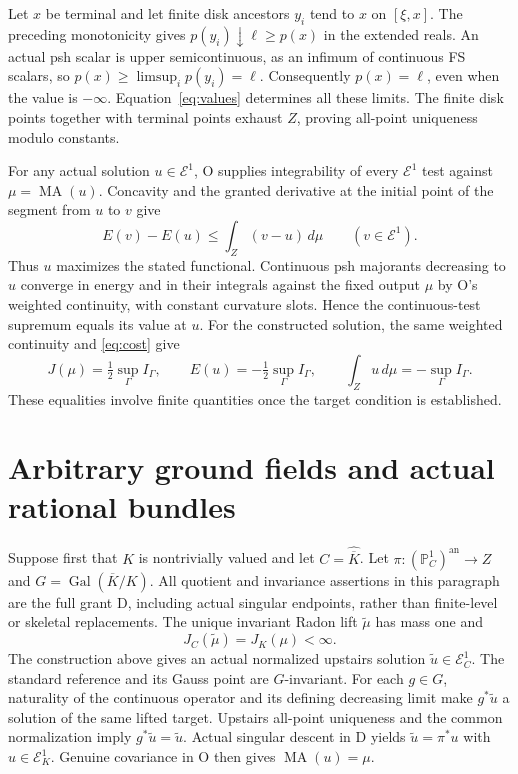 \documentclass[11pt]{article}
\newcommand{\MA}{\operatorname{MA}}
\newcommand{\E}{\mathcal E}
\newcommand{\an}{\mathrm{an}}
\begin{document}
Let $x$ be terminal and let finite disk ancestors $y_i$ tend
to $x$ on $[\xi,x]$. The preceding monotonicity gives
$p(y_i)\downarrow\ell\geq p(x)$ in the extended reals.
An actual psh scalar is upper semicontinuous, as an infimum
of continuous FS scalars, so
$p(x)\geq\limsup_i p(y_i)=\ell$. Consequently
$p(x)=\ell$, even when the value is $-\infty$.
Equation~\eqref{eq:values} determines all these limits.
The finite disk points together with terminal points exhaust
$Z$, proving all-point uniqueness modulo constants.

For any actual solution $u\in\E^1$, O supplies integrability
of every $\E^1$ test against $\mu=\MA(u)$. Concavity and
the granted derivative at the initial point of the segment
from $u$ to $v$ give
\[
 E(v)-E(u)\leq\int_Z(v-u)\,d\mu\qquad(v\in\E^1).
\]
Thus $u$ maximizes the stated functional. Continuous psh
majorants decreasing to $u$ converge in energy and in their
integrals against the fixed output $\mu$ by O's weighted
continuity, with constant curvature slots. Hence the
continuous-test supremum equals its value at $u$.
For the constructed solution, the same weighted continuity
and \eqref{eq:cost} give
\[
 J(\mu)=\tfrac12\sup_\Gamma I_\Gamma,
 \qquad E(u)=-\tfrac12\sup_\Gamma I_\Gamma,
 \qquad \int_Zu\,d\mu=-\sup_\Gamma I_\Gamma.
\]
These equalities involve finite quantities once the target
condition is established.

\section{Arbitrary ground fields and actual rational bundles}
\label{sec:descent}

Suppose first that $K$ is nontrivially valued and let
$C=\widehat{\overline K}$. Let
$\pi:(\mathbb P^1_C)^\an\to Z$ and
$G=\operatorname{Gal}(\overline K/K)$. All quotient and
invariance assertions in this paragraph are the full grant D,
including actual singular endpoints, rather than finite-level
or skeletal replacements. The unique invariant Radon lift
$\widetilde\mu$ has mass one and
\[
                  J_C(\widetilde\mu)=J_K(\mu)<\infty.
\]
The construction above gives an actual normalized upstairs
solution $\widetilde u\in\E_C^1$. The standard reference
and its Gauss point are $G$-invariant. For each $g\in G$,
naturality of the continuous operator and its defining
decreasing limit make $g^*\widetilde u$ a solution of the
same lifted target. Upstairs all-point uniqueness and the
common normalization imply $g^*\widetilde u=\widetilde u$.
Actual singular descent in D yields
$\widetilde u=\pi^*u$ with $u\in\E_K^1$. Genuine
covariance in O then gives $\MA(u)=\mu$.
\end{document}
